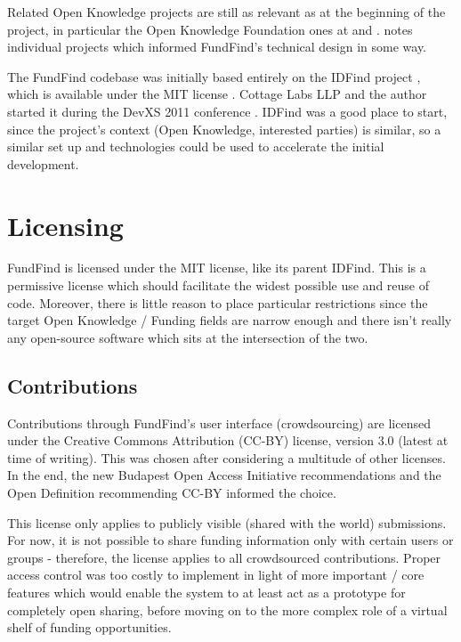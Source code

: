 Related Open Knowledge projects are still as relevant as at the beginning of the project, in particular the Open Knowledge Foundation ones at \cite{okfn-labs} and \cite{okfn-github}.  notes individual projects which informed FundFind's technical design in some way.

The FundFind codebase was initially based entirely on the IDFind project \cite{idfind}, which is available under the MIT license \cite{idfind-src}. Cottage Labs LLP and the author started it during the DevXS 2011 conference \cite{devxs}. IDFind was a good place to start, since the project's context (Open Knowledge, interested parties) is similar, so a similar set up and technologies could be used to accelerate the initial development.

\section{Licensing}

FundFind is licensed under the MIT license, like its parent IDFind. This is a permissive license which should facilitate the widest possible use and reuse of code. Moreover, there is little reason to place particular restrictions since the target Open Knowledge / Funding fields are narrow enough and there isn't really any open-source software which sits at the intersection of the two.

\subsection{Contributions}

Contributions through FundFind's user interface (crowdsourcing) are licensed under the Creative Commons Attribution (CC-BY) \cite{cc-by-3} license, version 3.0 (latest at time of writing). This was chosen after considering a multitude of other licenses. In the end, the new Budapest Open Access Initiative recommendations and the Open Definition \cite{od} recommending CC-BY informed the choice.

This license only applies to publicly visible (shared with the world) submissions. For now, it is not possible to share funding information only with certain users or groups - therefore, the license applies to all crowdsourced contributions. Proper access control was too costly to implement in light of more important / core features which would enable the system to at least act as a prototype for completely open sharing, before moving on to the more complex role of a virtual shelf of funding opportunities.

